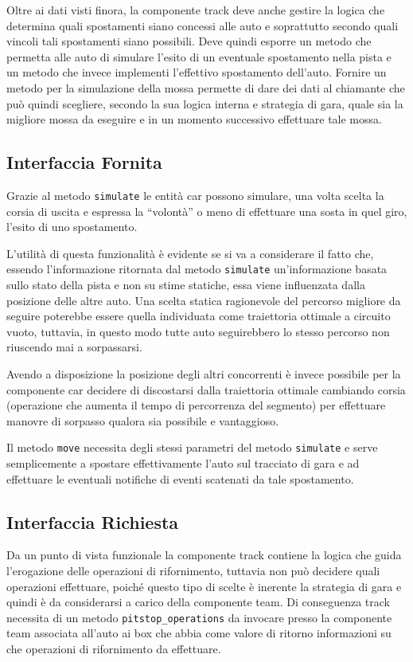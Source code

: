 \documentclass[11pt,a4paper]{report}
\newcommand{\fun}[1]{\texttt{#1}}
\begin{document}
Oltre ai dati visti finora, la componente track deve anche gestire la logica che determina quali spostamenti siano concessi alle auto e soprattutto secondo quali vincoli tali spostamenti siano possibili. Deve quindi esporre un metodo che permetta alle auto di simulare l'esito di un eventuale spostamento nella pista e un metodo che invece implementi l'effettivo spostamento dell'auto. Fornire un metodo per la simulazione della mossa permette di dare dei dati al chiamante che può quindi scegliere, secondo la sua logica interna e strategia di gara, quale sia la migliore mossa da eseguire e in un momento successivo effettuare tale mossa.
\subsection*{Interfaccia Fornita}
Grazie al metodo \fun{simulate} le entità car possono simulare, una volta scelta la corsia di uscita e espressa la ``volontà'' o meno di effettuare una sosta in quel giro, l'esito di uno spostamento.

L'utilità di questa funzionalità è evidente se si va a considerare il fatto che, essendo l'informazione ritornata dal metodo \fun{simulate} un'informazione basata sullo stato della pista e non su stime statiche, essa viene influenzata dalla posizione delle altre auto. Una scelta statica ragionevole del percorso migliore da seguire poterebbe essere quella individuata come traiettoria ottimale a circuito vuoto, tuttavia, in questo modo tutte auto seguirebbero lo stesso percorso non riuscendo mai a sorpassarsi.

Avendo a disposizione la posizione degli altri concorrenti è invece possibile per la componente car decidere di discostarsi dalla traiettoria ottimale cambiando corsia (operazione che aumenta il tempo di percorrenza del segmento) per effettuare manovre di sorpasso qualora sia possibile e vantaggioso.

Il metodo \fun{move} necessita degli stessi parametri del metodo \fun{simulate} e serve semplicemente a spostare effettivamente l'auto sul tracciato di gara e ad effettuare le eventuali notifiche di eventi scatenati da tale spostamento.
\subsection*{Interfaccia Richiesta}
Da un punto di vista funzionale la componente track contiene la logica che guida l'erogazione delle operazioni di rifornimento, tuttavia non può decidere quali operazioni effettuare, poiché questo tipo di scelte è inerente la strategia di gara e quindi è da considerarsi a carico della componente team. Di conseguenza track necessita di un metodo \fun{pitstop\_operations} da invocare presso la componente team associata all'auto ai box che abbia come valore di ritorno informazioni su che operazioni di rifornimento da effettuare.
\end{document}

